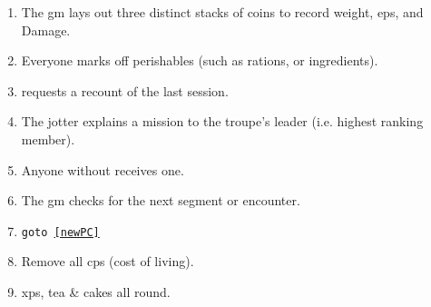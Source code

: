 
\begin{enumerate}
  \item
  The \gls{gm} lays out three distinct stacks of coins to record \gls{weight}, \glspl{ep}, and Damage.
  \item
  Everyone marks off perishables (such as \glspl{ration}, or \glspl{ingredient}).
  \item
   requests a recount of the last session.
  \item
  The \gls{jotter} explains a mission to the troupe's leader (i.e. highest ranking member).
  \item
  Anyone without  receives one.
  \label{newPC}
  \item
  The \gls{gm} checks for the next \gls{segment} or encounter.
  \item
  {\tt goto \ref{newPC}}
  \item
  Remove all \glspl{cp} (cost of living).
  \item
  \Glspl{xp}, tea \& cakes all round.
\end{enumerate}

